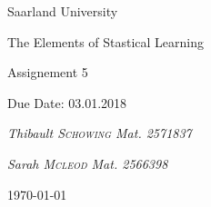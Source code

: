 \documentclass[11pt,a4paper,twoside,openright]{report}
\author{Thibault Schowing and Sarah Mcleod}
\newcommand\blankpage{%
	\null
	\thispagestyle{empty}%
	\addtocounter{page}{-1}%
	\newpage}
\begin{document}
	
	\pagestyle{plain}%

	
	
	\begin{titlepage}
		\centering
		
		\small{Saarland University  \par}
		\huge{The Elements of Stastical Learning\par}
		\vspace{1cm}
		
		
		
		\vspace{1cm}
		\Large{Assignement 5\par}
		\vspace{1.5cm}
		\small{Due Date: 03.01.2018  \par}
		\vspace{1cm}
		
		
		
		\vspace{2cm}
		\small\textit{Thibault \textsc{Schowing} Mat. 2571837}\par
		\small\textit{Sarah \textsc{Mcleod} Mat. 2566398}\par
		
		\small{\today\par}
		
		\vfill
		
		
	\end{titlepage}
	\restoregeometry 
	
	
	
	
	
	
	
	
	

	
\end{document}
